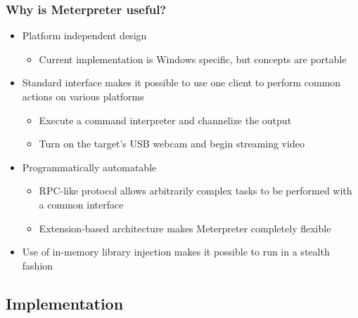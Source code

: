 \documentclass{beamer}
\newenvironment{sitemize}{\vspace{1mm}\begin{itemize}\itemsep 4pt\small}{\end{itemize}}
\begin{document}
\begin{frame}[t]
    \frametitle{Why is Meterpreter useful?}

    \begin{sitemize}
        \item Platform independent design
        \begin{sitemize}
            \item Current implementation is Windows specific, but
            concepts are portable
        \end{sitemize}

        \pause
        \item Standard interface makes it possible to use one client
        to perform common actions on various platforms

        \begin{sitemize}
            \pause
            \item Execute a command interpreter and channelize the
            output

            \pause
            \item Turn on the target's USB webcam and begin
            streaming video
        \end{sitemize}

        \pause
        \item Programmatically automatable
        \begin{sitemize}
            \item RPC-like protocol allows arbitrarily complex tasks
            to be performed with a common interface
            \item Extension-based architecture makes Meterpreter
            completely flexible
        \end{sitemize}

        \pause
        \item Use of in-memory library injection makes it possible
        to run in a stealth fashion
    \end{sitemize}
\end{frame}

\subsection{Implementation}
\end{document}
